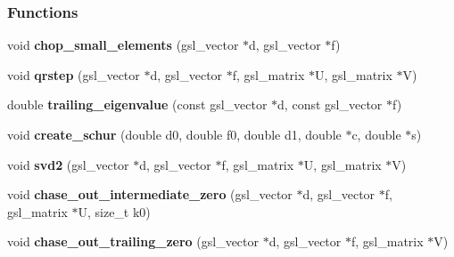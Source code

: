 \subsubsection*{Functions}
\begin{CompactItemize}
\item 
void \textbf{chop\_\-small\_\-elements} (gsl\_\-vector $\ast$d, gsl\_\-vector $\ast$f)\label{group__nr_g7a9b4689f2fcd8d6a417a071903df6f1}

\item 
void \textbf{qrstep} (gsl\_\-vector $\ast$d, gsl\_\-vector $\ast$f, gsl\_\-matrix $\ast$U, gsl\_\-matrix $\ast$V)\label{group__nr_g8e5d28fda0cf04d6d70392fa9580c2eb}

\item 
double \textbf{trailing\_\-eigenvalue} (const gsl\_\-vector $\ast$d, const gsl\_\-vector $\ast$f)\label{group__nr_g615603d99ef3bb2a21b32e13761a1474}

\item 
void \textbf{create\_\-schur} (double d0, double f0, double d1, double $\ast$c, double $\ast$s)\label{group__nr_g31a6def59f109d51a7e9af63a8850f0c}

\item 
void \textbf{svd2} (gsl\_\-vector $\ast$d, gsl\_\-vector $\ast$f, gsl\_\-matrix $\ast$U, gsl\_\-matrix $\ast$V)\label{group__nr_ge8a1bf5b51ec0f7ef1e067f01d466033}

\item 
void \textbf{chase\_\-out\_\-intermediate\_\-zero} (gsl\_\-vector $\ast$d, gsl\_\-vector $\ast$f, gsl\_\-matrix $\ast$U, size\_\-t k0)\label{group__nr_g1b67ba06b6b7daa4f73a163f404dd3d7}

\item 
void \textbf{chase\_\-out\_\-trailing\_\-zero} (gsl\_\-vector $\ast$d, gsl\_\-vector $\ast$f, gsl\_\-matrix $\ast$V)\label{group__nr_g15f37e448cf7eabd56ec2c351f148214}

\end{CompactItemize}
